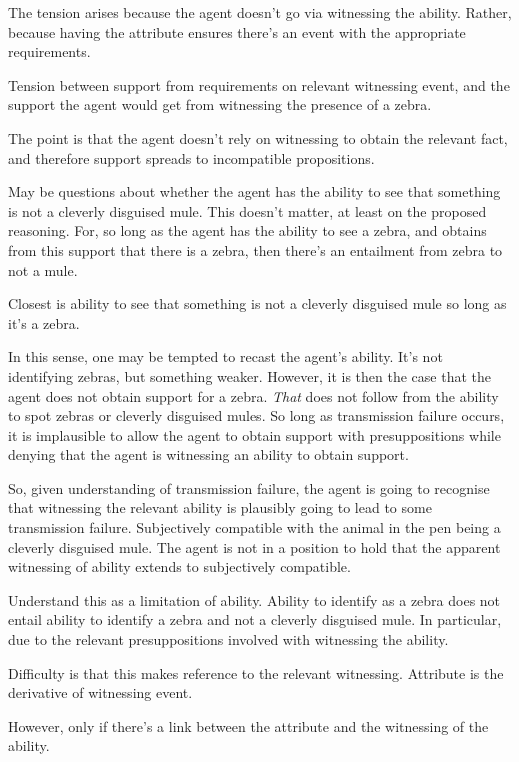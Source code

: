 \documentclass[10pt]{article}
\begin{document}
\begin{note}
  The tension arises because the agent doesn't go via witnessing the ability.
  Rather, because having the attribute ensures there's an event with the appropriate requirements.

  Tension between support from requirements on relevant witnessing event, and the support the agent would get from witnessing the presence of a zebra.
  
  The point is that the agent doesn't rely on witnessing to obtain the relevant fact, and therefore support spreads to incompatible propositions.

  May be questions about whether the agent has the ability to see that something is not a cleverly disguised mule.
  This doesn't matter, at least on the proposed reasoning.
  For, so long as the agent has the ability to see a zebra, and obtains from this support that there is a zebra, then there's an entailment from zebra to not a mule.

  Closest is ability to see that something is not a cleverly disguised mule so long as it's a zebra.
  
\end{note}

\begin{note}
  In this sense, one may be tempted to recast the agent's ability.
  It's not identifying zebras, but something weaker.
  However, it is then the case that the agent does not obtain support for a zebra.
  \emph{That} does not follow from the ability to spot zebras or cleverly disguised mules.
  So long as transmission failure occurs, it is implausible to allow the agent to obtain support with presuppositions while denying that the agent is witnessing an ability to obtain support.
\end{note}

\begin{note}
  So, given understanding of transmission failure, the agent is going to recognise that witnessing the relevant ability is plausibly going to lead to some transmission failure.
  Subjectively compatible with the animal in the pen being a cleverly disguised mule.
  The agent is not in a position to hold that the apparent witnessing of ability extends to subjectively compatible.

  Understand this as a limitation of ability.
  Ability to identify as a zebra does not entail ability to identify a zebra and not a cleverly disguised mule.
  In particular, due to the relevant presuppositions involved with witnessing the ability.

  Difficulty is that this makes reference to the relevant witnessing.
  Attribute is the derivative of witnessing event.



  However, only if there's a link between the attribute and the witnessing of the ability.
  
\end{note}
\end{document}
